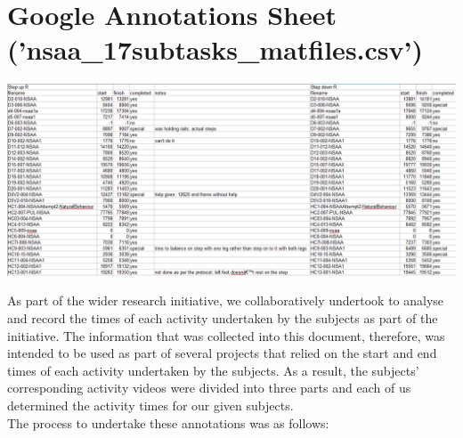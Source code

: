 \documentclass[12pt,twoside]{report}
\begin{document}
\section{Google Annotations Sheet ('nsaa\_17subtasks\_matfiles.csv')}

\begin{center}
\includegraphics[scale=0.4]{project_figures/fig7_1}
\end{center}

\quad As part of the wider research initiative, we collaboratively undertook to analyse and record the times of each activity undertaken by the subjects as part of the initiative. The information that was collected into this document, therefore, was intended to be used as part of several projects that relied on the start and end times of each activity undertaken by the subjects. As a result, the subjects’ corresponding activity videos were divided into three parts and each of us determined the activity times for our given subjects.\\

\quad The process to undertake these annotations was as follows:
\end{document}
